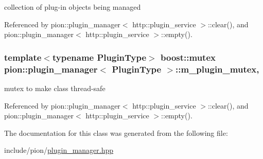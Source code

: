collection of plug-\/in objects being managed 



Referenced by pion\-::plugin\-\_\-manager$<$ http\-::plugin\-\_\-service $>$\-::clear(), and pion\-::plugin\-\_\-manager$<$ http\-::plugin\-\_\-service $>$\-::empty().

\hypertarget{classpion_1_1plugin__manager_a4ce56259eca75c8c88bdc4f778526ec4}{
\subsubsection[{m\-\_\-plugin\-\_\-mutex}]{\setlength{\rightskip}{0pt plus 5cm}template$<$typename Plugin\-Type$>$ boost\-::mutex {\bf pion\-::plugin\-\_\-manager}$<$ Plugin\-Type $>$\-::m\-\_\-plugin\-\_\-mutex\hspace{0.3cm}{\ttfamily [mutable]}, {\ttfamily [protected]}}}\label{classpion_1_1plugin__manager_a4ce56259eca75c8c88bdc4f778526ec4}


mutex to make class thread-\/safe 



Referenced by pion\-::plugin\-\_\-manager$<$ http\-::plugin\-\_\-service $>$\-::clear(), and pion\-::plugin\-\_\-manager$<$ http\-::plugin\-\_\-service $>$\-::empty().



The documentation for this class was generated from the following file\-:\begin{DoxyCompactItemize}
\item 
include/pion/\hyperlink{plugin__manager_8hpp}{plugin\-\_\-manager.\-hpp}\end{DoxyCompactItemize}
